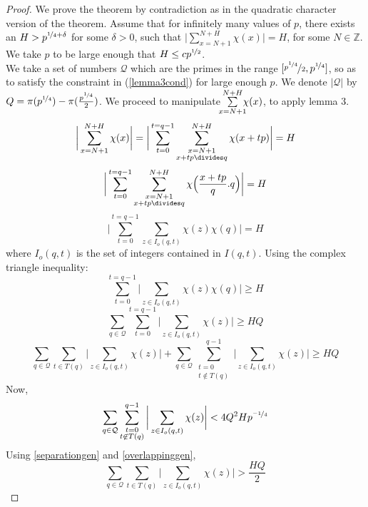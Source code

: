 \documentclass{report}
\begin{document}
\begin{proof}
We prove the theorem by contradiction as in the quadratic character version of the theorem. Assume that for infinitely many values of $p$, there exists an $H>p^{\nicefrac{1}{4}+\delta}$ for some $\delta>0$, such that $\Big \lvert \sum\limits_{x=N+1}^{N+H}\chi(x)\Big \rvert=H$, for some $N\in \mathbb{Z}$. We take $p$ to be large enough that $H\leq cp^{\nicefrac{1}{2}}$.\\
We take a set of numbers $\mathcal{Q}$ which are the primes in the range $[\nicefrac {p^{\nicefrac {1}{4}}}{2}, p^{\nicefrac {1}{4}}]$, so as to satisfy the constraint in (\ref{lemma3cond}) for large enough $p$. We denote $\lvert \mathcal{Q}\rvert$ by $Q=\pi(p^{\nicefrac{1}{4}})-\pi(\frac{p^ {\nicefrac{1}{4}}}{2})$. We proceed to manipulate $\ \sum\limits_{\mathclap{x=N+1}}^{\mathclap{N+H}}\ \chi(x)$, to apply lemma 3.
\[\bigg \lvert\sum\limits_{x=N+1}^{N+H}\chi(x)\bigg \rvert=\bigg \lvert\sum\limits_{t=0}^{t=q-1}\sum\limits_{\substack{x=N+1\\x+tp\divides q}}^{N+H}\chi(x+tp)\bigg \rvert=H \]
$$\bigg \lvert\sum\limits_{t=0}^{t=q-1}\sum\limits_{\substack{x=N+1\\x+tp\divides q}}^{N+H} \chi \Big(\frac{x+tp}{q}.q\Big)\bigg \rvert=H$$
$$\bigg \lvert\sum\limits_{t=0}^{t=q-1}\sum\limits_{z\in I_o(q,t)}\chi(z)\chi(q)\bigg \rvert=H$$
where $I_o(q,t)$ is the set of integers contained in $I(q,t)$. Using the complex triangle inequality:
$$\sum\limits_{t=0}^{t=q-1}\bigg \lvert\sum\limits_{z\in I_o(q,t)}\chi(z)\chi(q)\bigg \rvert \geq H$$
$$\sum_{q\in\mathcal{Q}}\sum\limits_{t=0}^{t=q-1}\bigg \lvert\sum\limits_{z\in I_o(q,t)}\chi(z)\bigg \rvert \geq HQ$$
\begin{equation} \label{separationgen}
\sum_{q\in\mathcal{Q}}\sum\limits_{t\in T(q)}\bigg \lvert\sum\limits_{z\in I_o(q,t)}\chi(z)\bigg \rvert+\sum_{q\in\mathcal{Q}}\sum\limits_{\substack{t=0\\t\not \in T(q)}}^{q-1}\bigg \lvert\sum\limits_{z\in I_o(q,t)}\chi(z)\bigg \rvert \geq HQ
\end{equation}
Now,
\begin{equation} \label{overlappinggen}
\sum_{q\in\mathcal{Q}}\sum\limits_{\substack{t=0\\t\not \in T(q)}}^{q-1}\bigg\lvert\sum\limits_{z\in I_o(q,t) }\chi(z)\bigg \rvert < 4Q^2 Hp^{\nicefrac{-1}{4}}
\end{equation}
Using \ref{separationgen} and \ref{overlappinggen},
\begin{equation} \label{sliceineqgen}
\sum_{q\in\mathcal{Q}}\sum\limits_{t\in T(q)}\bigg \lvert\sum\limits_{z\in I_o(q,t)}\chi(z)\bigg \rvert > \frac{HQ}{2}

\end{equation}
\end{proof}
\end{document}
